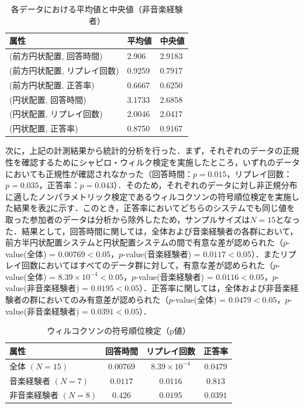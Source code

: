 \begin{table}[H]\centering 
    \caption{各データにおける平均値と中央値（非音楽経験者）}\label{tab:result_notpractice}
    \begin{tabular}{lll} \hline
    属性 & 平均値 & 中央値\\ \hline
    (前方円状配置, 回答時間) & 2.906 & 2.9183\\
    (前方円状配置, リプレイ回数) & 0.9259 & 0.7917 \\
    (前方円状配置, 正答率) & 0.6667 & 0.6250\\ \hline
    (円状配置, 回答時間) & 3.1733 & 2.6858\\
    (円状配置, リプレイ回数) & 2.0046 & 2.0417\\
    (円状配置, 正答率) & 0.8750 & 0.9167\\ \hline
    \end{tabular}
\end{table}

次に，上記の計測結果から統計的分析を行った．まず，それぞれのデータの正規性を確認するためにシャピロ・ウィルク検定を実施したところ，いずれのデータにおいても正規性が確認されなかった（回答時間：$p = 0.015$，リプレイ回数：$p = 0.035$，正答率：$p = 0.043$）．そのため，それぞれのデータに対し非正規分布に適したノンパラメトリック検定であるウィルコクソンの符号順位検定を実施した結果を表\ref{tab:Wilcoxon}に示す．このとき，正答率においてどちらのシステムでも同じ値を取った参加者のデータは分析から除外したため，サンプルサイズは$N = 15$となった．結果として，回答時間に関しては，全体および音楽経験者の各群において，前方半円状配置システムと円状配置システムの間で有意な差が認められた（$p$-value(全体) = $0.00769 < 0.05$，$p$-value(音楽経験者) = $0.0117 < 0.05$）．またリプレイ回数においてはすべてのデータ群に対して，有意な差が認められた（$p$-value(全体) = $8.39 \times 10^{-4} < 0.05$，$p$-value(音楽経験者) = $0.0116 < 0.05$，$p$-value(非音楽経験者) = $0.0195 < 0.05$）．正答率に関しては，全体および非音楽経験者の群においてのみ有意差が認められた（$p$-value(全体) = $0.0479 < 0.05$，$p$-value(非音楽経験者) = $0.0391 < 0.05$）．


\begin{table}[H] \centering 
    \caption{ウィルコクソンの符号順位検定（p値）}\label{tab:Wilcoxon}
    \begin{tabular}{lccc} \hline
        属性 & 回答時間 & リプレイ回数 & 正答率 \\ \hline
        全体 $(N=15)$       & $0.00769$  & $8.39 \times 10^{-4}$ & $0.0479$ \\
        音楽経験者 $(N=7)$   & $0.0117$  & $0.0116$              & $0.813$ \\
        非音楽経験者 $(N=8)$ & $0.426$  & $0.0195$              & $0.0391$ \\ \hline
    \end{tabular}
\end{table}


